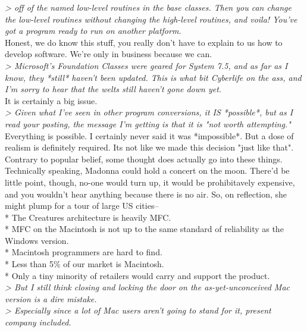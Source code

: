 \documentclass[11pt,twoside,a4paper]{article}
\begin{document}
\begin{multicols*}{2}
\emph{> off of the named low-level routines in the base classes. Then you can change the low-level routines without changing the high-level routines, and voila! You've got a program ready to run on another platform.}~\\

Honest, we do know this stuff, you really don't have to explain to us how to develop software. We're only in business because we can.~\\

\emph{> Microsoft's Foundation Classes were geared for System 7.5, and as far as I know, they *still* haven't been updated. This is what bit Cyberlife on the ass, and I'm sorry to hear that the welts still haven't gone down yet.}~\\

It is certainly a big issue.~\\

\emph{> Given what I've seen in other program conversions, it IS *possible*, but as I read your posting, the message I'm getting is that it is "not worth attempting."}~\\

Everything is possible. I certainly never said it was *impossible*. But a dose of realism is definitely required. Its not like we made this decision "just like that". Contrary to popular belief, some thought does actually go into these things. Technically speaking, Madonna could hold a concert on the moon. There'd be little point, though, no-one would turn up, it would be prohibitavely expensive, and you wouldn't hear anything because there is no air. So, on reflection, she might plump for a tour of large US cities--~\\
*  The Creatures architecture is heavily MFC.~\\
*  MFC on the Macintosh is not up to the same standard of reliability as the Windows version.~\\
*  Macintosh programmers are hard to find.~\\
*  Less than 5\% of our market is Macintosh.~\\
*  Only a tiny minority of retailers would carry and support the product.~\\

\emph{> But I still think closing and locking the door on the as-yet-unconceived Mac version is a dire mistake.}~\\
\emph{> Especially since a lot of Mac users aren't going to stand for it, present company included.}~\\


\end{multicols*}
\end{document}
